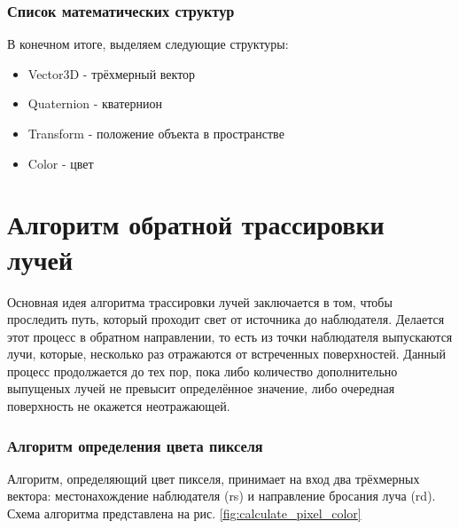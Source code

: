 \documentclass[a4paper, 14pt]{report}
\begin{document}
	\subsubsection{Список математических структур}
	В конечном итоге, выделяем следующие структуры:
	\begin{itemize}
		\item Vector3D - трёхмерный вектор
		\item Quaternion - кватернион
		\item Transform - положение объекта в пространстве
		\item Color - цвет
	\end{itemize}
	
	\section{Алгоритм обратной трассировки лучей}
	Основная идея алгоритма трассировки лучей заключается в том, чтобы проследить путь, который проходит свет от источника до наблюдателя. Делается этот процесс в обратном направлении, то есть из точки наблюдателя выпускаются лучи, которые, несколько раз отражаются от встреченных поверхностей. Данный процесс продолжается до тех пор, пока либо количество дополнительно выпущеных лучей не превысит определённое значение, либо очередная поверхность не окажется неотражающей.
	
	\subsubsection{Алгоритм определения цвета пикселя}
	Алгоритм, определяющий цвет пикселя, принимает на вход два трёхмерных вектора: местонахождение наблюдателя (rs) и направление бросания луча (rd). Схема алгоритма представлена на рис. \ref{fig:calculate_pixel_color}
	
\end{document}
